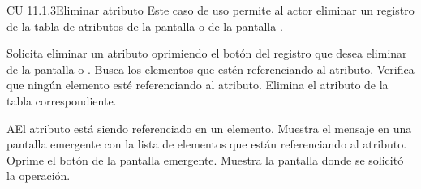 \begin{UseCase}{CU 11.1.3}{Eliminar atributo}
	{
		Este caso de uso permite al actor eliminar un registro de la tabla de atributos de la pantalla  o de la pantalla .
	}
	
	


\end{UseCase}
 \begin{UCtrayectoria}
    \UCpaso[\UCactor] Solicita eliminar un atributo oprimiendo el botón \btnEliminar del registro que desea eliminar de la pantalla  o .
    \UCpaso[\UCsist] Busca los elementos que estén referenciando al atributo.
    \UCpaso[\UCsist] Verifica que ningún elemento esté referenciando al atributo. 
    \UCpaso[\UCsist] Elimina el atributo de la tabla correspondiente.
 \end{UCtrayectoria}
 \begin{UCtrayectoriaA}{A}{El atributo está siendo referenciado en un elemento.}
    \UCpaso[\UCsist] Muestra el mensaje  en una pantalla emergente
    con la lista de elementos que están referenciando al atributo.
    \UCpaso[\UCactor] Oprime el botón  de la pantalla emergente.
    \UCpaso[\UCsist] Muestra la pantalla donde se solicitó la operación.
 \end{UCtrayectoriaA}
